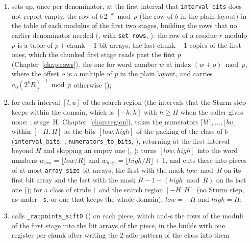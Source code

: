 \begin{enumerate}
  \item sets up, once per denominator, at the first interval that \verb|interval_bits| does not
    report empty, the row of $b\,2^{-k} \bmod p$ (the row of $b$ in the plain layout) in the table
    of each modulus of the first two stages, building the rows that no earlier denominator needed
    (, with \verb|set_rows|,
    ): the row of a residue $r$ modulo $p$ is a table of
    $p + \mathrm{chunk} - 1$ bit arrays, the last $\mathrm{chunk} - 1$ copies of the first ones,
    which the chunked first stage reads past the first $p$ (Chapter~\ref{chap:rows}), the one for
    word number $w$ at index $(w + o) \bmod p$, where the offset $o$ is a multiple of $p$ in the
    plain layout, and carries $a_0 (2^k R)^{-1} \bmod p$ otherwise
    ();
  \item for each interval $[l, u]$ of the search region (the intervals that the Sturm step keeps
    within the domain, which is $[-h, h]$ with $h \ge H$ when the caller gives none:
    ; stage~H, Chapter~\ref{chap:region}), takes the numerators
    $\lceil b l \rceil, \dots, \lfloor b u \rfloor$ within $[-H, H]$ as the bits
    $[\mathit{low}, \mathit{high}]$ of the packing of the class of $b$ (\verb|interval_bits|,
    ; \verb|numerators_to_bits|,
    ), returning at the first interval beyond $H$ and skipping an
    empty one (, ); turns
    $[\mathit{low}, \mathit{high}]$ into the word numbers
    $w_{\mathrm{low}} = \lfloor \mathit{low}/R \rfloor$ and
    $w_{\mathrm{high}} = \lfloor \mathit{high}/R \rfloor + 1$, and cuts these into pieces of at most
    \verb|array_size| bit arrays, the first with the mask $\mathit{low} \bmod R$ on its first bit
    array and the last with the mask $R - 1 - (\mathit{high} \bmod R)$ on its last one
    (); for a class of stride $1$ and the search region $[-H, H]$
    (no Sturm step, as under \verb|-s|, or one that keeps the whole domain), $\mathit{low} = -H$ and
    $\mathit{high} = H$;
  \item calls \verb|_ratpoints_sift0| () on each piece, which and-s the
    rows of the moduli of the first stage into the bit arrays of the piece, in the builds with one
    register per chunk after writing the 2-adic pattern of the class into them

\end{enumerate}
